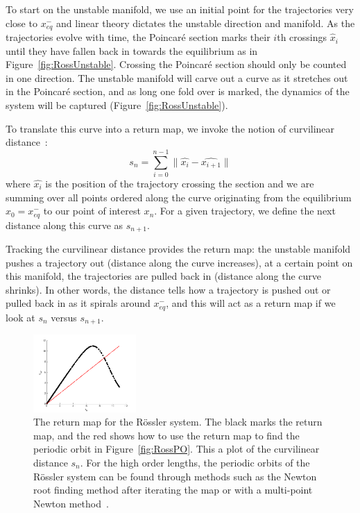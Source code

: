 \documentclass[12 pt]{article}
\begin{document}
To start on the unstable manifold, we use an initial point for the
trajectories very close to $x_{eq}^{-}$ and linear theory dictates the
unstable direction and manifold.  As the trajectories evolve with time,
the Poincar\'e section marks their $i$th crossings $\hat{x}_i$ until they
have fallen back in towards the equilibrium as in
Figure~\ref{fig:RossUnstable}.  Crossing the Poincar\'e section should
only be counted in one direction.  The unstable manifold will carve out a
curve as it stretches out in the Poincar\'e section, and as long one fold
over is marked, the dynamics of the system will be captured
(Figure~\ref{fig:RossUnstable}).

To translate this curve into a return map, we invoke the notion of
curvilinear distance~\cite{SRetMap}:
\begin{equation}
 s_n = \sum_{i = 0}^{n-1} \parallel \hat{x_i} - \hat{x_{i+1}} \parallel
 \label{eq:CurveDis}
\end{equation}
where $\hat{x_i}$ is the position of the trajectory crossing the section
and we are summing over all points ordered along the curve originating
from the equilibrium $x_0 = x_{eq}^{-}$ to our point of interest $x_n$.
For a given trajectory, we define the next distance along this curve as
$s_{n+1}$.

Tracking the curvilinear distance provides the return map: the unstable
manifold pushes a trajectory out (distance along the curve increases), at
a certain point on this manifold, the trajectories are pulled back in
(distance along the curve shrinks).  In other words, the distance tells
how a trajectory is pushed out or pulled back in as it spirals around
$x_{eq}^{-}$, and this will act as a return map if we look at $s_n$
versus $s_{n+1}$.
\begin{figure}[h]
\centering
  \includegraphics[width=0.35\textwidth]{Figs/Section1/kcrosslerretmap.png}
\caption{
 The return map for the R\"ossler system.  The black marks the return
 map, and the red shows how to use the return map to find the periodic
 orbit in Figure~\ref{fig:RossPO}.  This a plot of the curvilinear
 distance $s_n$.  For the high order lengths, the periodic orbits of the
 R\"ossler system can be found through methods such as the Newton root
 finding method after iterating the map or with a multi-point Newton
 method~\cite{CB}.
}
 \label{fig:RossRetmap}
\end{figure}
\end{document}

